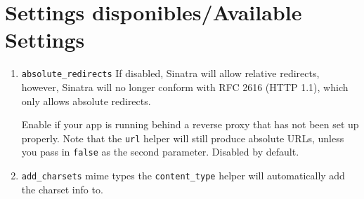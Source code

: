 \section{Settings disponibles/Available Settings}
\begin{enumerate}
\item 
\verb|absolute_redirects|
If disabled, Sinatra will allow relative redirects, however, Sinatra will no longer conform with RFC 2616 (HTTP 1.1), which only allows absolute redirects.

Enable if your app is running behind a reverse proxy that has not been set up properly. Note that the \verb|url| helper will still produce absolute URLs, unless you pass in \verb|false| as the second parameter.
Disabled by default.

\item 
\verb|add_charsets|
mime types the \verb|content_type| helper will automatically add the charset info to. 


\end{enumerate}
